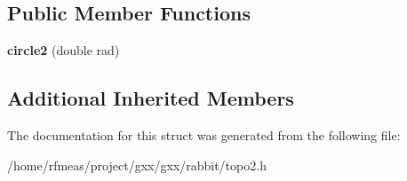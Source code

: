 \subsection*{Public Member Functions}
\begin{DoxyCompactItemize}
\item 
{\bfseries circle2} (double rad)\hypertarget{structrabbit_1_1circle2_a79dc420bd96a245af5f214d833f50f87}{}\label{structrabbit_1_1circle2_a79dc420bd96a245af5f214d833f50f87}

\end{DoxyCompactItemize}
\subsection*{Additional Inherited Members}


The documentation for this struct was generated from the following file\+:\begin{DoxyCompactItemize}
\item 
/home/rfmeas/project/gxx/gxx/rabbit/topo2.\+h\end{DoxyCompactItemize}
